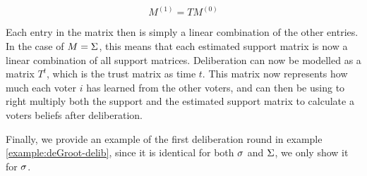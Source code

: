 \begin{equation}
	M^{(1)} = TM^{(0)}
	\label{eq:update_degroot}
\end{equation}

Each entry in the matrix then is simply a linear combination of the other entries. In the case of $M = \Sigma$, this means that each estimated support matrix is now a linear combination of all support matrices. Deliberation can now be modelled as a matrix $T^{t}$, which is the trust matrix as time $t$. This matrix now represents how much each voter $i$ has learned from the other voters, and can then be using to right multiply both the support and the estimated support matrix to calculate a voters beliefs after deliberation.

Finally, we provide an example of the first deliberation round in example \ref{example:deGroot-delib}, since it is identical for both $\sigma$ and  $\Sigma$, we only show it for $\sigma$.

